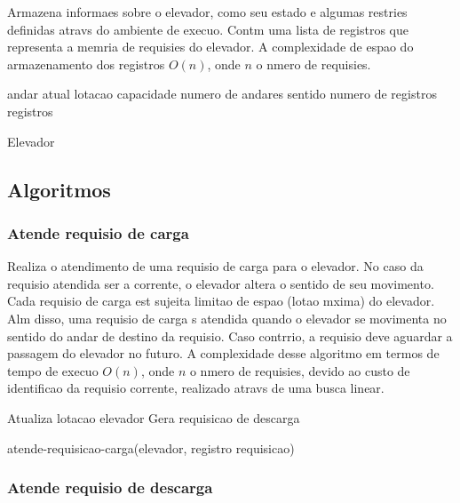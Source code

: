 \documentclass[12pt]{article}
\begin{document}
Armazena informaes sobre o elevador, como seu estado e algumas restries definidas atravs do ambiente de execuo. Contm uma lista de registros que representa a memria de requisies do elevador. A complexidade de espao do armazenamento dos registros  $O(n)$, onde $n$  o nmero de requisies.
\begin{algorithm}[h!]
\begin{footnotesize}

	andar atual\;
	lotacao\;
	capacidade\;
	numero de andares\;
	sentido\;
	numero de registros\;
	registros\;

\caption{Elevador}%
\end{footnotesize}
\end{algorithm}


\subsection{Algoritmos}

\subsubsection{Atende requisio de carga}

Realiza o atendimento de uma requisio de carga para o elevador. No caso da requisio atendida ser a corrente, o elevador altera o sentido de seu movimento. Cada requisio de carga est sujeita  limitao de espao (lotao mxima) do elevador. Alm disso, uma requisio de carga s  atendida quando o elevador se movimenta no sentido do andar de destino da requisio. Caso contrrio, a requisio deve aguardar a passagem do elevador no futuro. A complexidade desse algoritmo em termos de tempo de execuo  $O(n)$, onde $n$  o nmero de requisies, devido ao custo de identificao da requisio corrente, realizado atravs de uma busca linear.
\begin{algorithm}[h!]
\begin{footnotesize}


	Atualiza lotacao elevador\;
	Gera requisicao de descarga\;

\caption{atende-requisicao-carga(elevador, registro requisicao)}%
\end{footnotesize}
\end{algorithm}

\subsubsection{Atende requisio de descarga}
\end{document}
